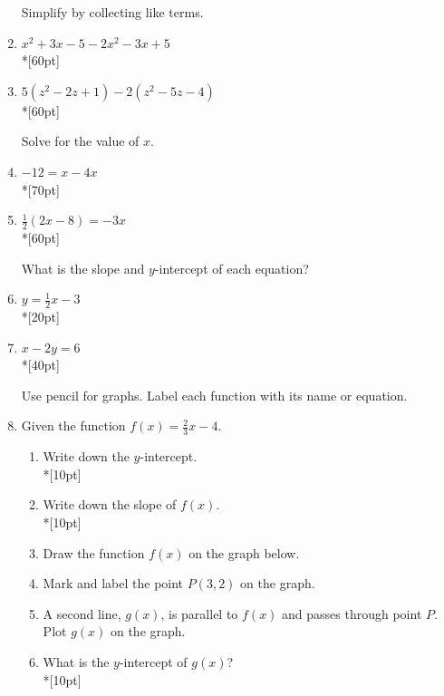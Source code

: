 \documentclass[12pt, oneside]{article}
\begin{document}
\begin{enumerate}
\newpage
Simplify by collecting like terms.

\item $x^2+3x -5 -2x^2-3x+5$\\*[60pt]
\item $5(z^2-2z +1) -2(z^2-5z-4)$\\*[60pt]


Solve for the value of $x$.
\item   $-12=x-4x$\\*[70pt]
\item   $\frac{1}{2}(2x-8)=-3x$\\*[60pt]


What is the slope and $y$-intercept of each equation? 
\item   $y=\frac{1}{2}x-3$\\*[20pt]
\item   $x-2y=6$\\*[40pt]

\newpage
Use pencil for graphs. Label each function with its name or equation. 
\item Given the function $f(x)=\frac{2}{3}x-4$. 
\begin{enumerate}
    \item Write down the $y$-intercept.\\*[10pt]
    \item Write down the slope of $f(x)$.\\*[10pt]
    \item Draw the function $f(x)$ on the graph below.
    \item Mark and label the point $P (3, 2)$ on the graph.
    \item A second line, $g(x)$, is parallel to $f(x)$ and passes through point $P$. Plot $g(x)$ on the graph.
    \item What is the $y$-intercept of $g(x)$?\\*[10pt]
\end{enumerate}


\end{enumerate}
\end{document}
